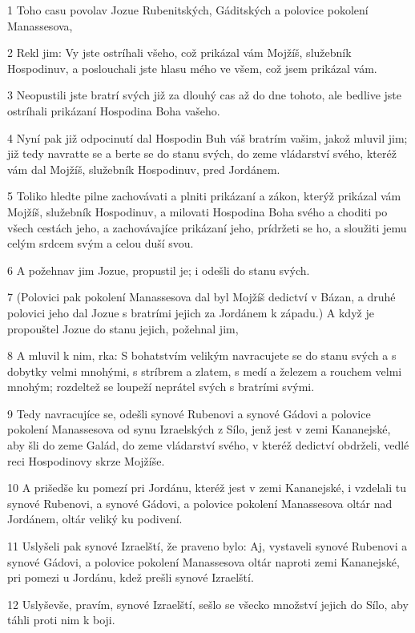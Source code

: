 \par 1 Toho casu povolav Jozue Rubenitských, Gáditských a polovice pokolení Manassesova,
\par 2 Rekl jim: Vy jste ostríhali všeho, což prikázal vám Mojžíš, služebník Hospodinuv, a poslouchali jste hlasu mého ve všem, což jsem prikázal vám.
\par 3 Neopustili jste bratrí svých již za dlouhý cas až do dne tohoto, ale bedlive jste ostríhali prikázaní Hospodina Boha vašeho.
\par 4 Nyní pak již odpocinutí dal Hospodin Buh váš bratrím vašim, jakož mluvil jim; již tedy navratte se a berte se do stanu svých, do zeme vládarství svého, kteréž vám dal Mojžíš, služebník Hospodinuv, pred Jordánem.
\par 5 Toliko hledte pilne zachovávati a plniti prikázaní a zákon, kterýž prikázal vám Mojžíš, služebník Hospodinuv, a milovati Hospodina Boha svého a choditi po všech cestách jeho, a zachovávajíce prikázaní jeho, prídržeti se ho, a sloužiti jemu celým srdcem svým a celou duší svou.
\par 6 A požehnav jim Jozue, propustil je; i odešli do stanu svých.
\par 7 (Polovici pak pokolení Manassesova dal byl Mojžíš dedictví v Bázan, a druhé polovici jeho dal Jozue s bratrími jejich za Jordánem k západu.) A když je propouštel Jozue do stanu jejich, požehnal jim,
\par 8 A mluvil k nim, rka: S bohatstvím velikým navracujete se do stanu svých a s dobytky velmi mnohými, s stríbrem a zlatem, s medí a železem a rouchem velmi mnohým; rozdeltež se loupeží neprátel svých s bratrími svými.
\par 9 Tedy navracujíce se, odešli synové Rubenovi a synové Gádovi a polovice pokolení Manassesova od synu Izraelských z Sílo, jenž jest v zemi Kananejské, aby šli do zeme Galád, do zeme vládarství svého, v kteréž dedictví obdrželi, vedlé reci Hospodinovy skrze Mojžíše.
\par 10 A prišedše ku pomezí pri Jordánu, kteréž jest v zemi Kananejské, i vzdelali tu synové Rubenovi, a synové Gádovi, a polovice pokolení Manassesova oltár nad Jordánem, oltár veliký ku podivení.
\par 11 Uslyšeli pak synové Izraelští, že praveno bylo: Aj, vystaveli synové Rubenovi a synové Gádovi, a polovice pokolení Manassesova oltár naproti zemi Kananejské, pri pomezi u Jordánu, kdež prešli synové Izraelští.
\par 12 Uslyševše, pravím, synové Izraelští, sešlo se všecko množství jejich do Sílo, aby táhli proti nim k boji.
